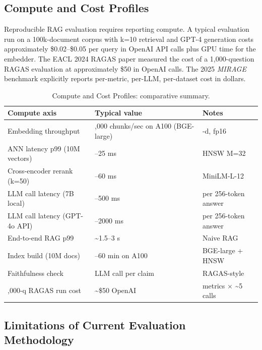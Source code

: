\documentclass{article}
\begin{document}
\subsection{Compute and Cost Profiles}\label{compute-and-cost-profiles}

Reproducible RAG evaluation requires reporting compute. A typical evaluation run on a 100k-document corpus with k=10 retrieval and GPT-4 generation costs approximately \$0.02--\$0.05 per query in OpenAI API calls plus GPU time for the embedder. The EACL 2024 RAGAS paper measured the cost of a 1,000-question RAGAS evaluation at approximately \$50 in OpenAI calls. The 2025 \emph{MIRAGE} benchmark explicitly reports per-metric, per-LLM, per-dataset cost in dollars.

\begin{table}[t]
\centering
\caption{Compute and Cost Profiles: comparative summary.}
\label{tab:compute-and-cost-profiles}
\begin{tabular}{>{\raggedright\arraybackslash}p{0.3412\linewidth}
  >{\raggedright\arraybackslash}p{0.4235\linewidth}
  >{\raggedright\arraybackslash}p{0.2353\linewidth}}
\toprule
Compute axis & Typical value & Notes \\
\midrule
Embedding throughput & 5,000 chunks/sec on A100 (BGE-large) & 1024-d, fp16 \\
ANN latency p99 (10M vectors) & 5--25 ms & HNSW M=32 \\
Cross-encoder rerank (k=50) & 30--60 ms & MiniLM-L-12 \\
LLM call latency (7B local) & 200--500 ms & per 256-token answer \\
LLM call latency (GPT-4o API) & 600--2000 ms & per 256-token answer \\
End-to-end RAG p99 & \textasciitilde1.5--3 s & Naive RAG \\
Index build (10M docs) & 30--60 min on A100 & BGE-large + HNSW \\
Faithfulness check & 1 LLM call per claim & RAGAS-style \\
1,000-q RAGAS run cost & \textasciitilde\$50 OpenAI & 4 metrics × \textasciitilde5 calls \\
\end{tabular}
\end{table}

\subsection{Limitations of Current Evaluation Methodology}\label{limitations-of-current-evaluation-methodology}
\end{document}
